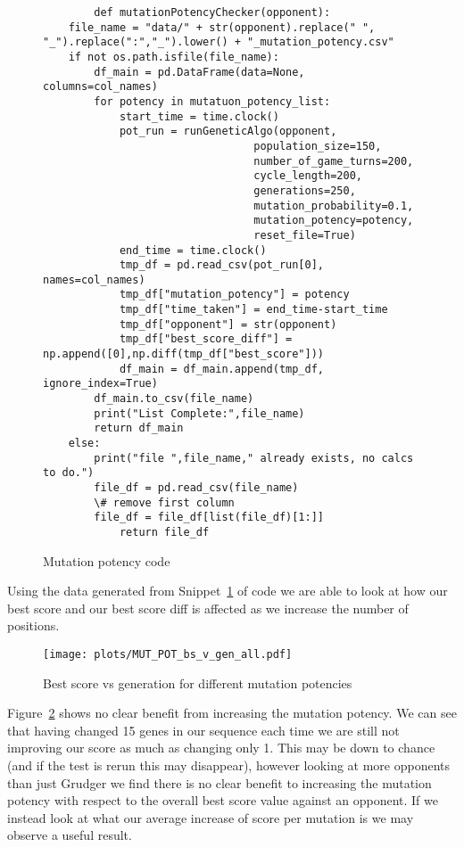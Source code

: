 \begin{figure}[ht] 
    \begin{verbatim}
        def mutationPotencyChecker(opponent):
    file_name = "data/" + str(opponent).replace(" ", "_").replace(":","_").lower() + "_mutation_potency.csv"
    if not os.path.isfile(file_name):
        df_main = pd.DataFrame(data=None, columns=col_names)
        for potency in mutatuon_potency_list:
            start_time = time.clock()
            pot_run = runGeneticAlgo(opponent,
                                 population_size=150,
                                 number_of_game_turns=200,
                                 cycle_length=200, 
                                 generations=250,
                                 mutation_probability=0.1,
                                 mutation_potency=potency,
                                 reset_file=True)
            end_time = time.clock()
            tmp_df = pd.read_csv(pot_run[0], names=col_names)
            tmp_df["mutation_potency"] = potency
            tmp_df["time_taken"] = end_time-start_time
            tmp_df["opponent"] = str(opponent)
            tmp_df["best_score_diff"] = np.append([0],np.diff(tmp_df["best_score"]))
            df_main = df_main.append(tmp_df, ignore_index=True)
        df_main.to_csv(file_name)
        print("List Complete:",file_name)
        return df_main
    else:
        print("file ",file_name," already exists, no calcs to do.")
        file_df = pd.read_csv(file_name) 
        \# remove first column
        file_df = file_df[list(file_df)[1:]]
            return file_df
    \end{verbatim}
    \caption{Mutation potency code}\label{code:mutationPotencyChecker}    
\end{figure}

Using the data generated from Snippet~\ref{code:mutationPotencyChecker} of code we are able to look at how our best score and our best score diff is affected as we increase the number of positions.\\

\begin{figure}[ht] 
\texttt{[image: plots/MUT\_POT\_bs\_v\_gen\_all.pdf]}
\caption{Best score vs generation for different mutation potencies}\label{fig:MUT-POT-bs-v-gen-all}
\end{figure}

Figure~\ref{fig:MUT-POT-bs-v-gen-all} shows no clear benefit from increasing the mutation potency.
We can see that having changed 15 genes in our sequence each time we are still not improving our score as much as changing only 1.
This may be down to chance (and if the test is rerun this may disappear), however looking at more opponents than just Grudger we find there is no clear benefit to increasing the mutation potency with respect to the overall best score value against an opponent.
If we instead look at what our average increase of score per mutation is we may observe a useful result.\\

